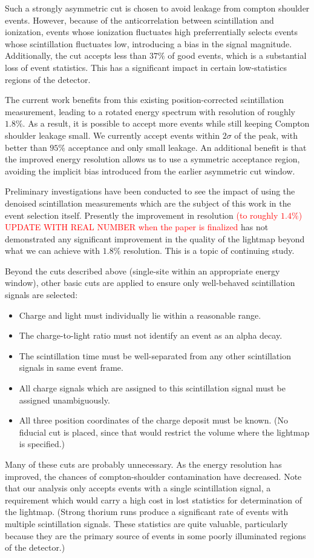 Such a strongly asymmetric cut is chosen to avoid leakage from compton shoulder events.  However, because of the anticorrelation between scintillation and ionization, events whose ionization fluctuates high preferrentially selects events whose scintillation fluctuates low, introducing a bias in the signal magnitude.  Additionally, the cut accepts less than $37\%$ of good events, which is a substantial loss of event statistics. This has a significant impact in certain low-statistics regions of the detector.

The current work benefits from this existing position-corrected scintillation measurement, leading to a rotated energy spectrum with resolution of roughly $1.8\%$.  As a result, it is possible to accept more events while still keeping Compton shoulder leakage small.  We currently accept events within $2\sigma$ of the peak, with better than $95\%$ acceptance and only small leakage.  An additional benefit is that the improved energy resolution allows us to use a symmetric acceptance region, avoiding the implicit bias introduced from the earlier asymmetric cut window.

Preliminary investigations have been conducted to see the impact of using the denoised scintillation measurements which are the subject of this work in the event selection itself.  Presently the improvement in resolution \textcolor{red}{(to roughly $1.4\%$) UPDATE WITH REAL NUMBER when the paper is finalized} has not demonstrated any significant improvement in the quality of the lightmap beyond what we can achieve with $1.8\%$ resolution. This is a topic of continuing study.

Beyond the cuts described above (single-site within an appropriate energy window), other basic cuts are applied to ensure only well-behaved scintillation signals are selected:
\begin{itemize}
\item Charge and light must individually lie within a reasonable range.
\item The charge-to-light ratio must not identify an event as an alpha decay.
\item The scintillation time must be well-separated from any other scintillation signals in same event frame.
\item All charge signals which are assigned to this scintillation signal must be assigned unambiguously.
\item All three position coordinates of the charge deposit must be known.  (No fiducial cut is placed, since that would restrict the volume where the lightmap is specified.)
\end{itemize}
Many of these cuts are probably unnecessary. As the energy resolution has improved, the chances of compton-shoulder contamination have decreased. Note that our analysis only accepts events with a single scintillation signal, a requirement which would carry a high cost in lost statistics for determination of the lightmap.  (Strong thorium runs produce a significant rate of events with multiple scintillation signals.  These statistics are quite valuable, particularly because they are the primary source of events in some poorly illuminated regions of the detector.)  

